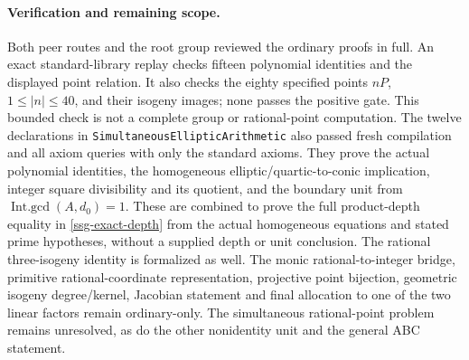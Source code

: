 \paragraph{Verification and remaining scope.}
Both peer routes and the root group reviewed the ordinary proofs
in full. An exact standard-library replay checks fifteen polynomial
identities and the displayed point relation. It also checks the
eighty specified points \(nP\), \(1\leq |n|\leq40\), and their isogeny
images; none passes the positive gate. This bounded check is not a
complete group or rational-point computation.
The twelve declarations in \texttt{SimultaneousEllipticArithmetic}
also passed fresh compilation and all axiom queries with only the
standard axioms. They prove the actual polynomial identities,
the homogeneous elliptic/quartic-to-conic implication, integer
square divisibility and its quotient, and the boundary unit from
\(\operatorname{Int.gcd}(A,d_0)=1\). These are combined to prove
the full product-depth equality in \eqref{ssg-exact-depth} from
the actual homogeneous equations and stated prime hypotheses,
without a supplied depth or unit conclusion. The rational
three-isogeny identity is formalized as well.
The monic rational-to-integer bridge, primitive rational-coordinate
representation, projective point bijection, geometric isogeny
degree/kernel, Jacobian statement and final allocation to one of
the two linear factors remain ordinary-only.
The simultaneous rational-point problem remains unresolved, as do
the other nonidentity unit and the general ABC statement.
